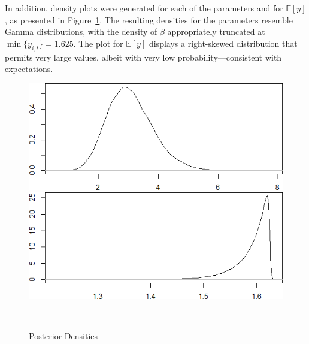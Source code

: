 \documentclass{Class/julia}
\begin{document}
In addition, density plots were generated for each of the parameters and for \( \mathbb{E}[y] \), as presented in Figure~\ref{fig:1}. The resulting densities for the parameters resemble Gamma distributions, with the density of \( \beta \) appropriately truncated at \( \min\{y_{i,t}\} = 1.625 \). The plot for \( \mathbb{E}[y] \) displays a right-skewed distribution that permits very large values, albeit with very low probability---consistent with expectations.

\begin{figure}[!ht]
    \centering
    \caption{Posterior Densities}
    \label{fig:1}
    \begin{minipage}{0.45\textwidth}
        \centering
        \includegraphics[width=\textwidth]{rytgaard1990/density_alpha.png}
        \subcaption{\( \alpha \)}
    \end{minipage}%
    \hfill
    \begin{minipage}{0.45\textwidth}
        \centering
        \includegraphics[width=\textwidth]{rytgaard1990/density_beta.png}
        \subcaption{\( \beta \)}
    \end{minipage} \\
    
    \vspace{0.5cm}
    

\end{figure}
\end{document}
